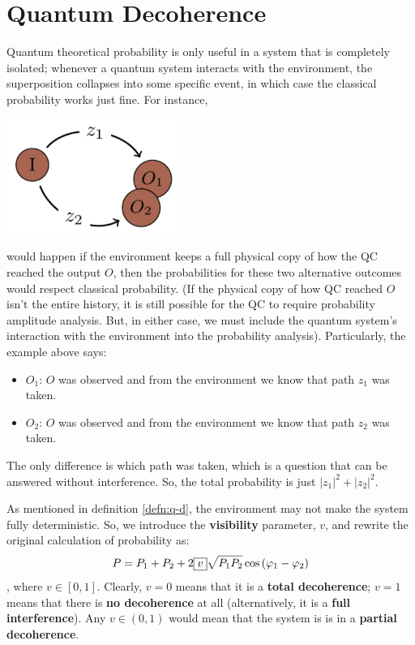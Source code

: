 \documentclass[12pt]{article}
\begin{document}
\section{Quantum Decoherence}
\begin{definition}\label{defn:q-d}
Quantum theoretical probability is only useful in a system that is completely isolated; whenever a quantum system interacts with the environment, the superposition collapses into some specific event, in which case the classical probability works just fine. For instance,
\begin{center}
\includegraphics[width = 15em]{images/5.jpg}
\end{center}
would happen if the environment keeps a full physical copy of how the QC reached the output $O$, then the probabilities for these two alternative outcomes would respect classical probability. (If the physical copy of how QC reached $O$ isn't the entire history, it is still possible for the QC to require probability amplitude analysis. But, in either case, we must include the quantum system's interaction with the environment into the probability analysis). Particularly, the example above says:
\begin{itemize}
    \item $O_1$: $O$ was observed and from the environment we know that path $z_1$ was taken.
    \item $O_2$: $O$ was observed and from the environment we know that path $z_2$ was taken.
\end{itemize}
The only difference is which path was taken, which is a question that can be answered without interference. So, the total probability is just $|z_1|^2 + |z_2|^2$.
\end{definition}

\begin{definition}
As mentioned in definition \ref{defn:q-d}, the environment may not make the system fully deterministic. So, we introduce the \textbf{visibility} parameter, $v$, and rewrite the original calculation of probability as:$$
P = P_1 + P_2 + 2\boxed{v}\sqrt{P_1P_2}\cos\left(\varphi_1 - \varphi_2\right)
$$, where $v\in [0,1]$. Clearly, $v = 0$ means that it is a \textbf{total decoherence}; $v=1$ means that there is \textbf{no decoherence} at all (alternatively, it is a \textbf{full interference}). Any $v\in (0,1)$ would mean that the system is is in a \textbf{partial decoherence}.
\end{definition}
\end{document}
